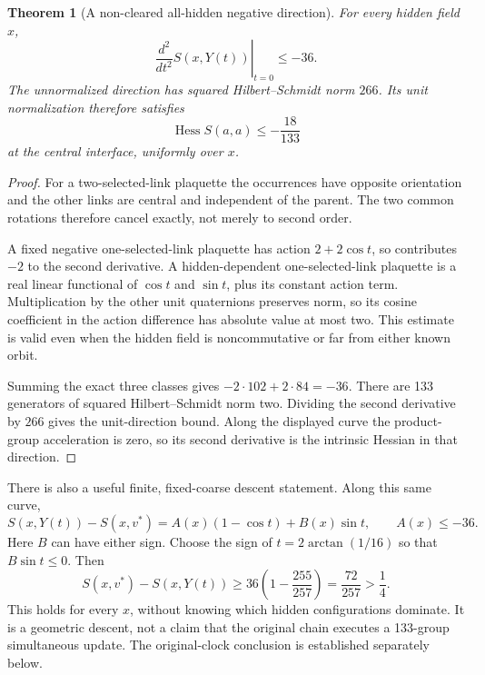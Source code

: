 \documentclass[11pt,oneside]{article}
\newtheorem{theorem}{Theorem}[section]
\begin{document}
\begin{theorem}[A non-cleared all-hidden negative direction]
\label{thm:f13v13-curvature}
For every hidden field \(x\),
\begin{equation}\label{eq:f13v13-curvature}
 \left.\frac{d^2}{dt^2}S(x,Y(t))\right|_{t=0}
                  \le-36.
\end{equation}
The unnormalized direction has squared
Hilbert--Schmidt norm \(266\). Its unit
normalization therefore satisfies
\[
                    \operatorname{Hess}S(a,a)
                            \le-\frac{18}{133}
\]
at the central interface, uniformly over \(x\).
\end{theorem}

\begin{proof}
For a two-selected-link plaquette the occurrences
have opposite orientation and the other links
are central and independent of the parent.
The two common rotations therefore cancel
exactly, not merely to second order.

A fixed negative one-selected-link plaquette
has action \(2+2\cos t\), so contributes \(-2\)
to the second derivative. A hidden-dependent
one-selected-link plaquette is a real linear
functional of \(\cos t\) and \(\sin t\), plus
its constant action term. Multiplication by
the other unit quaternions preserves norm,
so its cosine coefficient in the action
difference has absolute value at most two.
This estimate is valid even when the hidden
field is noncommutative or far from either
known orbit.

Summing the exact three classes gives
\(-2\cdot102+2\cdot84=-36\).
There are 133 generators of squared
Hilbert--Schmidt norm two. Dividing the
second derivative by \(266\) gives the
unit-direction bound. Along the displayed
curve the product-group acceleration is
zero, so its second derivative is the
intrinsic Hessian in that direction.
\end{proof}

There is also a useful finite, fixed-coarse
descent statement. Along this same curve,
\[
 S(x,Y(t))-S(x,v^*)
                  =A(x)(1-\cos t)+B(x)\sin t,
                         \qquad A(x)\le-36 .
\]
Here \(B\) can have either sign. Choose the
sign of \(t=2\arctan(1/16)\) so that
\(B\sin t\le0\). Then
\[
 S(x,v^*)-S(x,Y(t))\ge
              36\left(1-\frac{255}{257}\right)
                      =\frac{72}{257}>\frac14 .
\]
This holds for every \(x\), without knowing
which hidden configurations dominate.
It is a geometric descent, not a claim
that the original chain executes a 133-group
simultaneous update. The original-clock
conclusion is established separately below.
\end{document}
